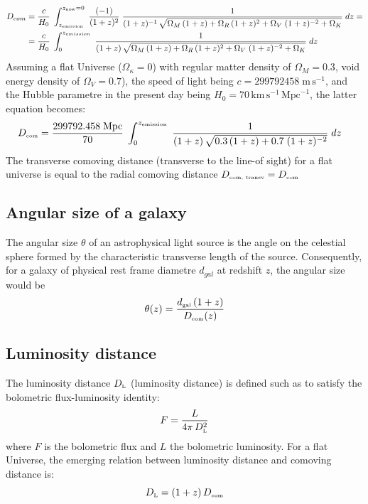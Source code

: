 \begin{equation} \begin{aligned} 
D_{com} &  =   \dfrac{c}{H_0}\; \int_{z_{\mbox{\tiny{emission}}}}^{z_{\mbox{\tiny{now}}} = 0} \; \dfrac{(-1)}{(1+z)^2}\; \dfrac{1}{(1+z)^{-1}\,\sqrt{ \Omega_M\,(1+z)+\Omega_R\,(1+z)^2+ \Omega_V \;(1+z)^{-2} + \Omega_K } }  \;dz =   \\ & =  \dfrac{c}{H_0}\; \int_0^{z_{emission}} \; \dfrac{1}{(1+z)\,\sqrt{ \Omega_M\,(1+z)+\Omega_R\,(1+z)^2+ \Omega_V \;(1+z)^{-2} + \Omega_K } }  \;dz \end{aligned}  \label{eq:ComD}  \end{equation}
Assuming a flat Universe ($\Omega_\kappa=0$) with regular matter density of $\Omega_Μ=0.3$,  void energy density of $\Omega_V=0.7$), the speed of light being $c= 299 792 458\;\mbox{m}\,\mbox{s}^{-1}$, and the Hubble parametre in the present day being $Η_0 = 70\, \mbox{km}\,\mbox{s}^{-1}\,\mbox{Mpc}^{-1}$, the latter equation becomes:
\begin{equation} \begin{aligned} 
D_{\mbox{\tiny{com}}} &   =  \dfrac{299792.458 \;\mbox{Mpc}}{70}\; \int_0^{z_{\mbox{\tiny{emission}}}} \; \dfrac{1}{(1+z)\,\sqrt{ 0.3\,(1+z)+ 0.7 \;(1+z)^{-2} } }  \;dz \end{aligned} \end{equation}
The transverse comoving distance (transverse to the line-of sight) \cite{HoggCosmoDist} for a flat universe is equal to the radial comoving distance $ D_{\mbox{\tiny{com, transv}}}  = D_{\mbox{\tiny{com}}}$

\subsection{Angular size of a galaxy} \label{sec:Cosmo-AngS}
The angular size $\theta$ of an astrophysical light source is the angle on the celestial sphere formed by the characteristic transverse length of the source. Consequently, for a galaxy of physical rest frame diametre $d_{gal}$ at redshift $z$, the angular size would be 
\begin{equation} \theta (z)  =  \dfrac{d_{\mbox{\tiny{gal}}}\, (1+z)}{D_{\mbox{\tiny{com}}}(z)} \label{eq:AngS}  \end{equation}

\subsection{Luminosity distance} \label{sec:Cosmo-LumiD}
The luminosity distance $D_{\mbox{\tiny{L}}}$ (luminosity distance) is defined such as to satisfy the bolometric flux-luminosity identity:
\begin{equation} F = \dfrac{L}{4\pi\,D^2_{\mbox{\tiny{L}}}} \label{eq:Flux-LumiD}\end{equation}
where $F$ is the bolometric flux and $L$ the bolometric luminosity. For a flat Universe, the emerging relation\cite{HoggCosmoDist} between luminosity distance and comoving distance is:
\begin{equation}  D_{\mbox{\tiny{L}}} = (1+z) \,D_{\mbox{\tiny{com}}} \label{eq:LumiD}\end{equation}

